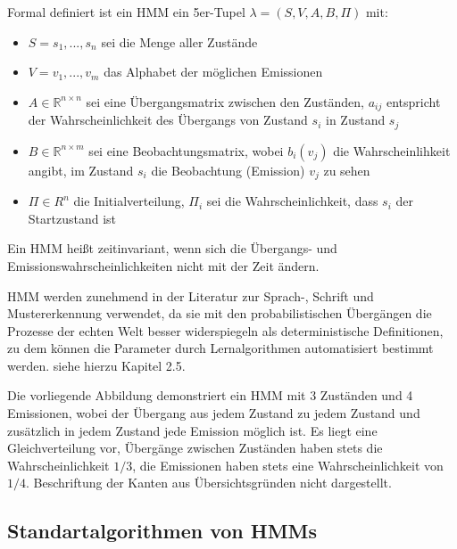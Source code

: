 Formal definiert ist ein HMM ein 5er-Tupel $\lambda= (S, V, A, B, \Pi)$ mit:

\begin{itemize}
 \item $S = {s_1,..., s_n}$ sei die Menge aller Zustände
 \item $V = {v_1,..., v_m}$ das Alphabet der möglichen Emissionen
 \item $A \in \mathbb{R}^{n \times n}$ sei eine Übergangsmatrix zwischen den Zuständen, $a_{ij}$ entspricht der Wahrscheinlichkeit des Übergangs von Zustand $s_i$ in Zustand $s_j$
 \item $B \in \mathbb{R}^{n\times m}$ sei eine Beobachtungsmatrix, wobei $b_i(v_j)$ die Wahrscheinlihkeit angibt, im Zustand $s_i$ die Beobachtung (Emission) $v_j$ zu sehen
 \item $\Pi \in R^n$ die Initialverteilung, $\Pi_i$ sei die Wahrscheinlichkeit, dass $s_i$ der Startzustand ist
\end{itemize}

Ein HMM heißt zeitinvariant, wenn sich die Übergangs- und Emissionswahrscheinlichkeiten nicht mit der Zeit ändern.

HMM werden zunehmend in der Literatur zur Sprach-, Schrift und Mustererkennung \cite{Gales:2007:AHM:1373536.1373537}\cite{Yang1995161} verwendet, da sie mit den probabilistischen Übergängen die Prozesse der echten Welt besser widerspiegeln als deterministische Definitionen, zu dem können die Parameter durch Lernalgorithmen automatisiert bestimmt werden.
 siehe hierzu Kapitel 2.5.




Die vorliegende Abbildung demonstriert ein HMM mit 3 Zuständen und 4 Emissionen, wobei der Übergang aus jedem Zustand zu jedem Zustand und zusätzlich in jedem Zustand jede Emission möglich ist.
Es liegt eine Gleichverteilung vor, Übergänge zwischen Zuständen haben stets die Wahrscheinlichkeit $1/3$, die Emissionen haben stets eine Wahrscheinlichkeit von $1/4$.
 Beschriftung der Kanten aus Übersichtsgründen nicht dargestellt.


\subsection{Standartalgorithmen von HMMs}
\label{sec:standartalgorithmenHMM}


